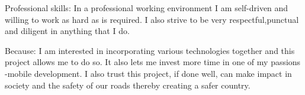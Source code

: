 \inlineheadsection
  {Professional skills:}
  {In a professional working environment I am self-driven and willing to work as hard as is required. I also strive to be very respectful,punctual and diligent in anything that I do.}
  
\spacedhrule{1.6em}{-0.4em}  
  

\inlineheadsection
  {Because:}
  {I am  interested in incorporating various technologies together and this project allows me to do so. It also lets me invest more time in one of my passions -mobile development. I also trust this project, if done well, can make impact in society and the safety of our roads thereby creating a safer country.}